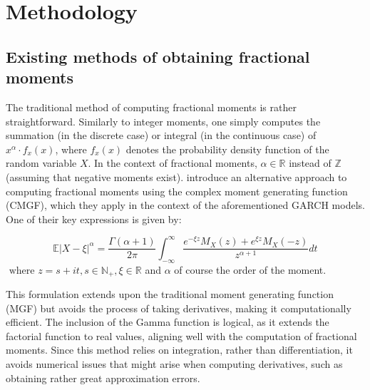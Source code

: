 \section{Methodology}\label{s:methodology}
\subsection{Existing methods of obtaining fractional moments}
The traditional method of computing fractional moments is rather straightforward. Similarly to integer moments, one simply computes the summation (in the discrete case) or integral (in the continuous case) of \(x^\alpha \cdot f_x(x)\), where \(f_x(x)\) denotes the probability density function of the random variable \(X\). In the context of fractional moments, \(\alpha \in \mathbb{R}\) instead of \(\mathbb{Z}\) (assuming that negative moments exist). \cite{hansen2024} introduce an alternative approach to computing fractional moments using the complex moment generating function (CMGF), which they apply in the context of the aforementioned GARCH models. One of their key expressions is given by:

\[\mathbb{E}\left| X - \xi \right|^\alpha = \frac{\Gamma(\alpha+1)}{2\pi} \int_{-\infty}^{\infty} \frac{e^{-\xi z} M_X(z) + e^{\xi z} M_X(-z)}{z^{\alpha+1}} dt\] \(\text{ where } z = s + it, s \in \mathbb{N_+}, \xi \in \mathbb{R} \) and \(\alpha\) of course the order of the moment.

This formulation extends upon the traditional moment generating function (MGF) but avoids the process of taking derivatives, making it computationally efficient. The inclusion of the Gamma function is logical, as it extends the factorial function to real values, aligning well with the computation of fractional moments. Since this method relies on integration, rather than differentiation, it avoids numerical issues that might arise when computing derivatives, such as obtaining rather great approximation errors.

